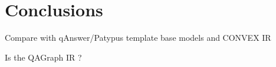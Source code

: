 \chapter{Conclusions}
\label{chap:dev-conclusions}

Compare with qAnswer/Patypus template base models and CONVEX IR

Is the QAGraph IR ?